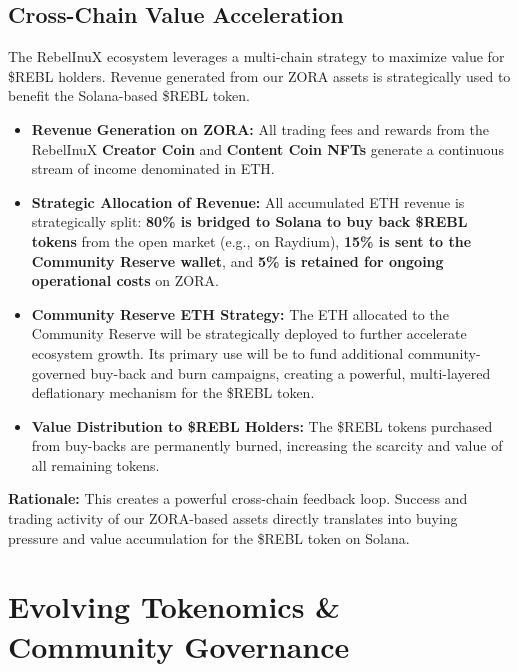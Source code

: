 \documentclass{article}
\begin{document}
\begin{tcolorbox}[colback=headerColor!10!white, colframe=headerColor, boxrule=2pt, width=\textwidth, arc=6mm, left=8mm, right=8mm, top=6mm, bottom=6mm]

\subsection[
  \texorpdfstring{\color{primaryColor}Cross-Chain Value Acceleration}{Cross-Chain Value Acceleration}
]{\color{primaryColor}Cross-Chain Value Acceleration}

The RebelInuX ecosystem leverages a multi-chain strategy to maximize value for \$REBL holders. Revenue generated from our ZORA assets is strategically used to benefit the Solana-based \$REBL token.

\begin{itemize}
    \item \textbf{Revenue Generation on ZORA:} All trading fees and rewards from the RebelInuX \textbf{Creator Coin} and \textbf{Content Coin NFTs} generate a continuous stream of income denominated in ETH.
  \item \textbf{Strategic Allocation of Revenue:} All accumulated ETH revenue is strategically split: \textbf{80\% is bridged to Solana to buy back \$REBL tokens} from the open market (e.g., on Raydium), \textbf{15\% is sent to the Community Reserve wallet}, and \textbf{5\% is retained for ongoing operational costs} on ZORA. 
    \item \textbf{Community Reserve ETH Strategy:} The ETH allocated to the Community Reserve will be strategically deployed to further accelerate ecosystem growth. Its primary use will be to fund additional community-governed buy-back and burn campaigns, creating a powerful, multi-layered deflationary mechanism for the \$REBL token.
    \item \textbf{Value Distribution to \$REBL Holders:} The \$REBL tokens purchased from buy-backs are permanently burned, increasing the scarcity and value of all remaining tokens.
\end{itemize}

\textbf{Rationale:} This creates a powerful cross-chain feedback loop. Success and trading activity of our ZORA-based assets directly translates into buying pressure and value accumulation for the \$REBL token on Solana.
\end{tcolorbox}

\section[
  \texorpdfstring{\color{primaryColor}Evolving Tokenomics \& Community Governance}{Evolving Tokenomics \& Community Governance}
]{\color{primaryColor}\textbf{Evolving Tokenomics \& Community Governance}}
\end{document}
